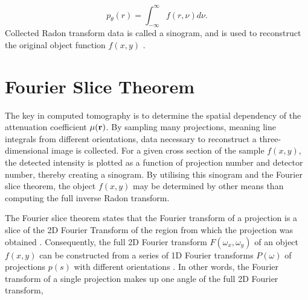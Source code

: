 \begin{equation}\label{eq:Radon_transform}
    p_{\theta}(r) = \int_{-\infty}^{\infty} f(r,\nu) d\nu.
\end{equation}
Collected Radon transform data is called a sinogram, and is used to reconstruct the original object function $f(x,y)$ \cite{gonzalez2018digital}.


\section{Fourier Slice Theorem}
The key in computed tomography is to determine the spatial dependency of the attenuation coefficient $\mu(\bm{\mathrm{r}})$.
By sampling many projections, meaning line integrals from different orientations, data necessary to reconstruct a three-dimensional image is collected.
For a given cross section of the sample $f(x, y)$, the detected intensity is plotted as a function of projection number and detector number, thereby creating a sinogram.
By utilising this sinogram and the Fourier slice theorem, the object $f(x, y)$ may be determined by other means than computing the full inverse Radon transform.

The Fourier slice theorem states that the Fourier transform of a projection
is a slice of the 2D Fourier Transform of the region from which the projection was obtained \cite{gonzalez2018digital}.
Consequently, the full 2D Fourier transform
$F(\omega_x, \omega_y)$ of an object $f(x,y)$ can be constructed from a series of 1D Fourier transforms
$P(\omega)$ of projections $p(s)$ with different orientations \cite{zeng2010medical}.
In other words, the Fourier transform of a single projection makes up one angle of the full 2D Fourier transform,


